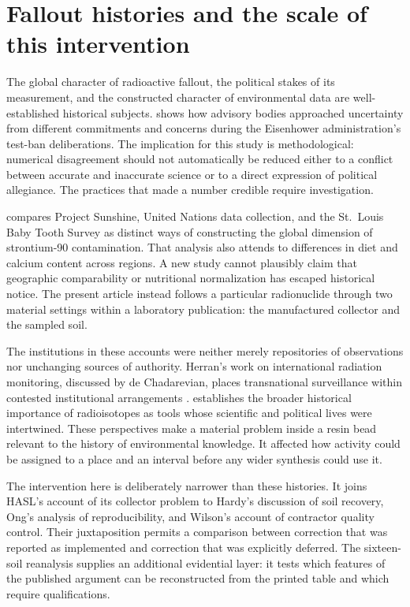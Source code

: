 \documentclass[11pt,a4paper]{article}
\begin{document}
\section{Fallout histories and the scale of this intervention}
The global character of radioactive fallout, the political stakes of its measurement, and the constructed character of environmental data are well-established historical subjects. \citet{higuchi2018} shows how advisory bodies approached uncertainty from different commitments and concerns during the Eisenhower administration's test-ban deliberations. The implication for this study is methodological: numerical disagreement should not automatically be reduced either to a conflict between accurate and inaccurate science or to a direct expression of political allegiance. The practices that made a number credible require investigation.

\citet{chadarevian2024} compares Project Sunshine, United Nations data collection, and the St.~Louis Baby Tooth Survey as distinct ways of constructing the global dimension of strontium-90 contamination. That analysis also attends to differences in diet and calcium content across regions. A new study cannot plausibly claim that geographic comparability or nutritional normalization has escaped historical notice. The present article instead follows a particular radionuclide through two material settings within a laboratory publication: the manufactured collector and the sampled soil.

The institutions in these accounts were neither merely repositories of observations nor unchanging sources of authority. Herran's work on international radiation monitoring, discussed by de Chadarevian, places transnational surveillance within contested institutional arrangements \citep{herran2014,chadarevian2024}. \citet{creager2013} establishes the broader historical importance of radioisotopes as tools whose scientific and political lives were intertwined. These perspectives make a material problem inside a resin bead relevant to the history of environmental knowledge. It affected how activity could be assigned to a place and an interval before any wider synthesis could use it.

The intervention here is deliberately narrower than these histories. It joins HASL's account of its collector problem to Hardy's discussion of soil recovery, Ong's analysis of reproducibility, and Wilson's account of contractor quality control. Their juxtaposition permits a comparison between correction that was reported as implemented and correction that was explicitly deferred. The sixteen-soil reanalysis supplies an additional evidential layer: it tests which features of the published argument can be reconstructed from the printed table and which require qualifications.
\end{document}
